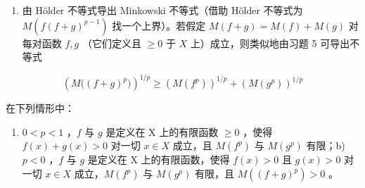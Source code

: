 \begin{enumerate}
\def\labelenumi{\arabic{enumi})}
\setcounter{enumi}{5}
\tightlist
\item
  由 Hölder 不等式导出 Minkowski 不等式（借助 Hölder 不等式为 \(M(f(f + g)^{p-1})\) 找一个上界）。若假定 \(M(f + g) = M(f) + M(g)\) 对每对函数 \(f, g\) （它们定义且 \(\geqslant 0\) 于 \(X\) 上）成立，则类似地由习题 5 可导出不等式
\end{enumerate}

\[
\left(M \big ((f + g) ^ {p} \big)\right) ^ {1 / p} \geqslant \left(M (f ^ {p})\right) ^ {1 / p} + \left(M (g ^ {p})\right) ^ {1 / p}
\]

在下列情形中：

\begin{enumerate}
\def\labelenumi{\alph{enumi})}
\tightlist
\item
  \(0 < p < 1\) ，\(f\) 与 \(g\) 是定义在 X 上的有限函数 \(\geqslant 0\) ，使得 \(f(x) + g(x) > 0\) 对一切 \(x \in X\) 成立，且 \(M(f^p)\) 与 \(M(g^p)\) 有限；b) \(p < 0\) ，\(f\) 与 \(g\) 是定义在 X 上的有限函数，使得 \(f(x) > 0\) 且 \(g(x) > 0\) 对一切 \(x \in X\) 成立，\(M(f^p)\) 与 \(M(g^p)\) 有限，且 \(M((f + g)^p) > 0\) 。
\end{enumerate}

